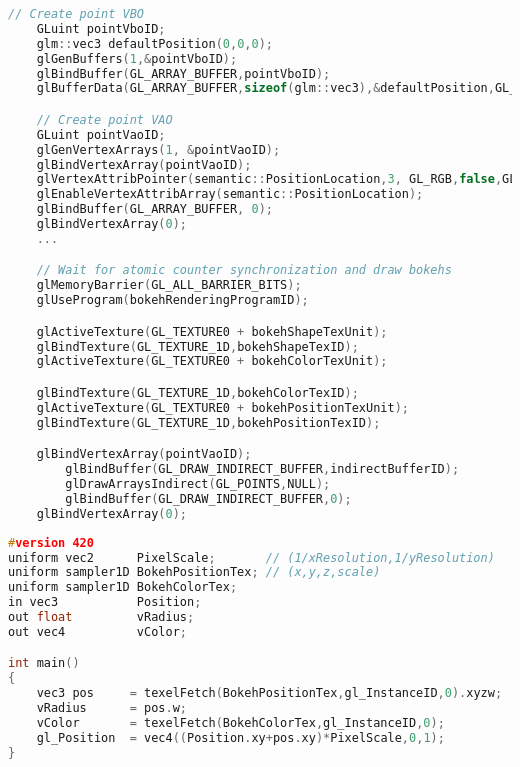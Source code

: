 \begin{lstlisting}[language=C++,float={htb},caption={Host application for rendering bokeh \emph{(Pass 4)}.},label={Derousiers:renderingbokehcpp}]
	// Create point VBO
	GLuint pointVboID;
	glm::vec3 defaultPosition(0,0,0);
	glGenBuffers(1,&pointVboID);
	glBindBuffer(GL_ARRAY_BUFFER,pointVboID);
	glBufferData(GL_ARRAY_BUFFER,sizeof(glm::vec3),&defaultPosition,GL_STATIC_DRAW);

	// Create point VAO
	GLuint pointVaoID;
	glGenVertexArrays(1, &pointVaoID);
	glBindVertexArray(pointVaoID);
	glVertexAttribPointer(semantic::PositionLocation,3, GL_RGB,false,GL_FLOAT,GLF_BUFFER_OFFSET(_offset));
	glEnableVertexAttribArray(semantic::PositionLocation);
	glBindBuffer(GL_ARRAY_BUFFER, 0);
	glBindVertexArray(0);
	...

	// Wait for atomic counter synchronization and draw bokehs
	glMemoryBarrier(GL_ALL_BARRIER_BITS);
	glUseProgram(bokehRenderingProgramID);

	glActiveTexture(GL_TEXTURE0 + bokehShapeTexUnit);
	glBindTexture(GL_TEXTURE_1D,bokehShapeTexID);
	glActiveTexture(GL_TEXTURE0 + bokehColorTexUnit);

	glBindTexture(GL_TEXTURE_1D,bokehColorTexID);
	glActiveTexture(GL_TEXTURE0 + bokehPositionTexUnit);
	glBindTexture(GL_TEXTURE_1D,bokehPositionTexID);

	glBindVertexArray(pointVaoID);
		glBindBuffer(GL_DRAW_INDIRECT_BUFFER,indirectBufferID);
		glDrawArraysIndirect(GL_POINTS,NULL);
		glBindBuffer(GL_DRAW_INDIRECT_BUFFER,0);
	glBindVertexArray(0);
\end{lstlisting}


\begin{lstlisting}[language=C++,float={htb},caption={Pixel shader application for rendering bokeh \emph{(Pass 4)}.},label={Derousiers:renderingbokehvs}]
#version 420
uniform vec2      PixelScale;       // (1/xResolution,1/yResolution)
uniform sampler1D BokehPositionTex; // (x,y,z,scale)
uniform sampler1D BokehColorTex;
in vec3           Position;
out float         vRadius;
out vec4          vColor;

int main()
{
	vec3 pos     = texelFetch(BokehPositionTex,gl_InstanceID,0).xyzw;
	vRadius      = pos.w;
	vColor       = texelFetch(BokehColorTex,gl_InstanceID,0);
	gl_Position	 = vec4((Position.xy+pos.xy)*PixelScale,0,1);
}
\end{lstlisting}

